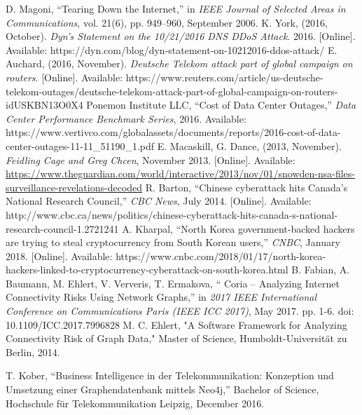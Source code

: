 \documentclass[conference, 11pt]{IEEEtran}
\begin{document}



\begin{thebibliography}{00}
D. Magoni, ``Tearing Down the Internet,'' in \textit{ IEEE Journal of Selected Areas in Communications}, vol. 21(6), pp. 949–960, September 2006. %
K. York, (2016, October). \textit{Dyn’s Statement on the 10/21/2016 DNS DDoS Attack}. 2016. [Online]. Available: https://dyn.com/blog/dyn-statement-on-10212016-ddos-attack/ %
E. Auchard, (2016, November). \textit{Deutsche Telekom attack part of global campaign on routers}. [Online]. Available: https://www.reuters.com/article/us-deutsche-telekom-outages/deutsche-telekom-attack-part-of-global-campaign-on-routers-idUSKBN13O0X4 %
Ponemon Institute LLC, ``Cost of Data Center Outages,'' \textit{Data Center Performance Benchmark Series}, 2016. Available: https://www.vertivco.com/globalassets/documents/reports/2016-cost-of-data-center-outages-11-11\_51190\_1.pdf %
 E. Macaskill, G. Dance, (2013, November). \textit{Feidling Cage and Greg Chcen}, November 2013. [Online]. Available: \url{https://www.theguardian.com/world/interactive/2013/nov/01/snowden-nsa-files-surveillance-revelations-decoded} %
R. Barton, ``Chinese cyberattack hits Canada's National Research Council,'' \textit{CBC News}, July 2014. [Online]. Available: http://www.cbc.ca/news/politics/chinese-cyberattack-hits-canada-s-national-research-council-1.2721241 %
A. Kharpal, ``North Korea government-backed hackers are trying to steal cryptocurrency from South Korean users,'' \textit{CNBC}, January 2018. [Online]. Available: https://www.cnbc.com/2018/01/17/north-korea-hackers-linked-to-cryptocurrency-cyberattack-on-south-korea.html %
B. Fabian, A. Baumann, M. Ehlert, V. Ververis, T. Ermakova, `` Coria – Analyzing Internet Connectivity Risks Using Network Graphs,'' in \textit{2017 IEEE International Conference on Communications Paris (IEEE ICC 2017)}, May 2017.  pp. 1-6. doi: 10.1109/ICC.2017.7996828 %
M. C. Ehlert, "A Software Framework for Analyzing Connectivity Risk of Graph Data," Master of Science, Humboldt-Universität zu Berlin, 2014. %

T. Kober, ``Business Intelligence in der Telekommunikation: Konzeption und Umsetzung einer Graphendatenbank mittels Neo4j,'' Bachelor of Science, Hochschule für Telekommunikation Leipzig, December 2016. %


\end{thebibliography}
\end{document}
